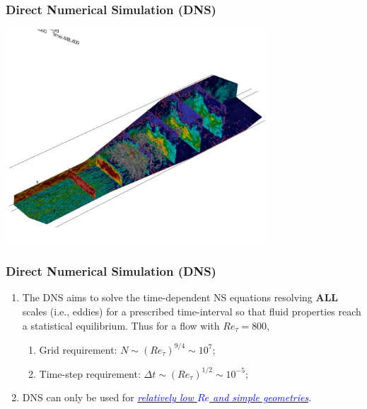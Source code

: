 \documentclass[10pt,compress,handout,ignorenonframetext]{beamer}
\newcommand{\blue}{\textcolor{blue}}
\begin{document}
\begin{frame}
 \frametitle{Direct Numerical Simulation (DNS)}
      \begin{center}
        \includegraphics[width=9.cm, height=8cm, clip]{./Figs/DNS_Exampleb}
      \end{center}
\end{frame}


\begin{frame}
 \frametitle{Direct Numerical Simulation (DNS)}
    \begin{enumerate}
       \item<1-> The DNS aims to solve the time-dependent NS equations resolving {\bf ALL} scales (i.e., eddies) for a prescribed time-interval so that fluid properties reach a statistical equilibrium. Thus for a flow with $Re_{\tau}=800$,
          \begin{enumerate}
            \item<1-> Grid requirement: $N\sim\left(Re_{\tau}\right)^{9/4}\sim 10^{7}$;
            \item<1-> Time-step requirement: $\Delta t\sim \left(Re_{\tau}\right)^{1/2}\sim 10^{-5}$;
          \end{enumerate}
       \item<2-> DNS can only be used for \underline{\blue{\it relatively low $Re$ and simple geometries}}.
    \end{enumerate} 
\end{frame}
\end{document}
